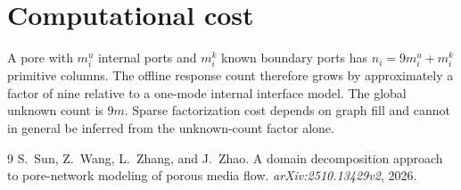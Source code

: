 \documentclass[11pt,a4paper]{article}
\begin{document}
\section{Computational cost}

A pore with $m_i^u$ internal ports and $m_i^k$ known boundary ports has
$n_i=9m_i^u+m_i^k$ primitive columns.  The offline response count therefore
grows by approximately a factor of nine relative to a one-mode internal
interface model.  The global unknown count is $9m$.  Sparse factorization cost
depends on graph fill and cannot in general be inferred from the unknown-count
factor alone.

\begin{thebibliography}{9}
S.~Sun, Z.~Wang, L.~Zhang, and J.~Zhao.
\newblock A domain decomposition approach to pore-network modeling of porous
media flow.
\newblock \emph{arXiv:2510.13429v2}, 2026.
\end{thebibliography}
\end{document}
